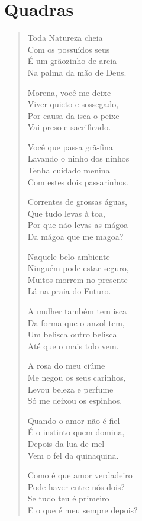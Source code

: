 \chapter{Quadras}

\begin{verse}
Toda Natureza cheia\\
Com os possuídos seus\\
É um grãozinho de areia\\
Na palma da mão de Deus.

Morena, você me deixe\\
Viver quieto e sossegado,\\
Por causa da isca o peixe\\
Vai preso e sacrificado.

Você que passa grã-fina\\
Lavando o ninho dos ninhos\\
Tenha cuidado menina\\
Com estes dois passarinhos.

Correntes de grossas águas,\\
Que tudo levas à toa,\\
Por que não levas as mágoa\\
Da mágoa que me magoa?

Naquele belo ambiente\\
Ninguém pode estar seguro,\\
Muitos morrem no presente\\
Lá na praia do Futuro.

A mulher também tem isca\\
Da forma que o anzol tem,\\
Um belisca outro belisca\\
Até que o mais tolo vem.

A rosa do meu ciúme\\
Me negou os seus carinhos,\\
Levou beleza e perfume\\
Só me deixou os espinhos.

Quando o amor não é fiel\\
É o instinto quem domina,\\
Depois da lua-de-mel\\
Vem o fel da quinaquina.

Como é que amor verdadeiro\\
Pode haver entre nós dois?\\
Se tudo teu é primeiro\\
E o que é meu sempre depois?


\end{verse}
